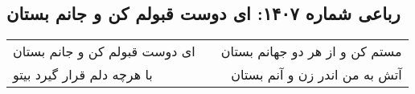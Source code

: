 \begin{center}
\section*{رباعی شماره ۱۴۰۷: ای دوست قبولم کن و جانم بستان}
\label{sec:1407}
\begin{longtable}{l p{0.5cm} r}
ای دوست قبولم کن و جانم بستان
&&
مستم کن و از هر دو جهانم بستان
\\
با هرچه دلم قرار گیرد بیتو
&&
آتش به من اندر زن و آنم بستان
\\
\end{longtable}
\end{center}
